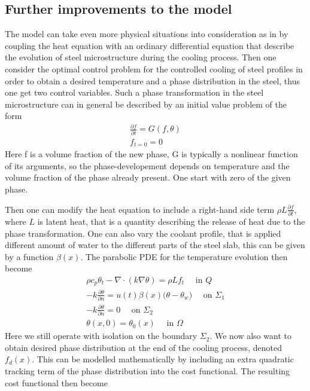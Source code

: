 


\subsection{Further improvements to the model}
The model can take even more physical situations into consideration as in \cite{DPSteelOverview} by coupling the  heat equation with an ordinary differential equation that describe the evolution of steel microstructure during the cooling process. Then one consider the optimal control problem for the controlled cooling of steel profiles in order to obtain a desired temperature and a phase distribution in the steel, thus one get two control variables. Such a phase transformation in the steel microstructure can in general be described by an initial value problem of the form 
\begin{align*}
    \frac{\partial f}{\partial t} = G(f,\theta ) \\
    f_{t=0} = 0
\end{align*}
Here f is a volume fraction of the new phase, G is typically a nonlinear function of its arguments, so the phase-developement depends on temperature and the volume fraction of the phase already present. One start with zero of the given phase. 

Then one can modify the heat equation to include a right-hand side term $\rho L \frac{\partial f}{\partial t}$, where $L$ is latent heat, that is a quantity describing the release of heat due to the phase transformation. One can also vary the coolant profile, that is applied different amount of water to the different parts of the steel slab, this can be given by a function $\beta (x)$. The parabolic PDE for the temperature evolution then become 
\begin{align*}
    \rho c_p \theta_t - \nabla \cdot (k\nabla \theta) = \rho L f_t \quad \textrm{ in } Q \\
    - k \frac{\partial \theta}{\partial n} = u(t)\beta(x) \bigg (\theta - \theta_w \bigg ) \quad \textrm{ on } \Sigma_1 \\
    -k \frac{\partial \theta}{\partial n} = 0 \quad \textrm{ on } \Sigma_2 \\
    \theta(x,0) = \theta_0(x) \quad \textrm{ in } \Omega
\end{align*}
Here we still operate with isolation on the boundary $\Sigma_2$. We now also want to obtain desired phase distribution at the end of the cooling process, denoted $f_d(x)$. This can be modelled mathematically by including an extra quadratic tracking term of the phase distribution into the cost functional. The resulting cost functional then become

